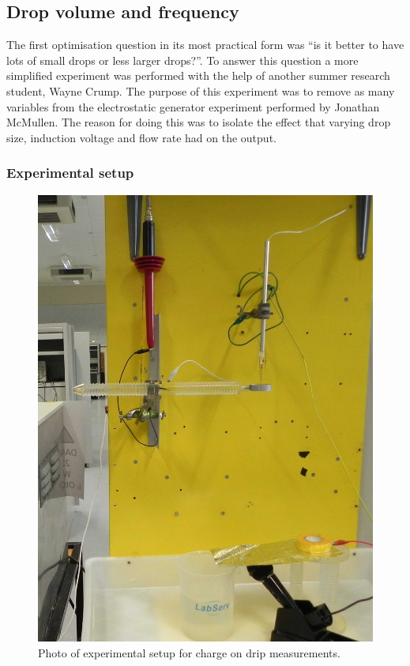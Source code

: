 \subsection*{Drop volume and frequency}

The first optimisation question in its most practical form was ``is it better to have lots of small drops or less larger drops?''.
To answer this question a more simplified experiment was performed with the help of another summer research student, Wayne Crump.
The purpose of this experiment was to remove as many variables from the electrostatic generator experiment performed by Jonathan McMullen.
The reason for doing this was to isolate the effect that varying drop size, induction voltage and flow rate had on the output.


 \subsubsection*{Experimental setup}

\begin{figure}
    \centering
    \includegraphics[scale=0.15]{content/appendices/chargedWaterDrops/graphics/Photo_dripperExperiment_Setup_draft.JPG}
    \caption{\label{Photo_dripperExperiment_Setup}Photo of experimental setup
    for charge on drip measurements.}
\end{figure}


